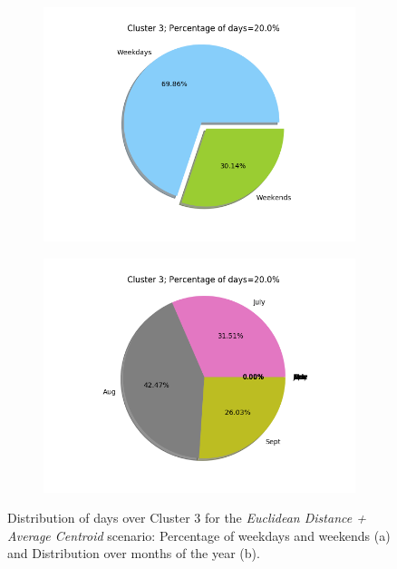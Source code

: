 \documentclass[9pt,journal,compsoc]{IEEEtran}
\begin{document}
\begin{figure}[H]
	\centering
	\begin{subfigure}{0.8\columnwidth}
		\includegraphics[scale=0.4]{images/percent_week_euc_average_cluster3_k4.png}
		\caption{}
	\end{subfigure}\hfill%
	
	\begin{subfigure}{0.8\columnwidth}
		\includegraphics[scale=0.4]{images/percent_months_euc_average_cluster3_k4.png}
		\caption{}
	\end{subfigure}%
	\caption{Distribution of days over Cluster $3$ for the \emph{Euclidean Distance + Average Centroid} scenario: Percentage of weekdays and weekends (a) and Distribution over months of the year (b).}
	\label{cluster3_euclidean}
\end{figure}
\end{document}
